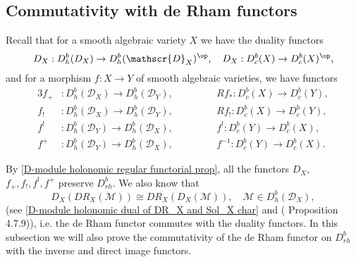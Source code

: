 \subsection{Commutativity with de Rham functors}
Recall that for a smooth algebraic variety $X$ we have the duality functors
\[D_X:D^b_h(D_X)\to D^b_h(\mathscr{D}_X)^{\op},\quad D_X:D^b_c(X)\to D^b_c(X)^{\op},\]
and for a morphism $f:X\to Y$ of smooth algebraic varieties, we have functors
\begin{alignat*}{3}
f_+&:D^b_h(\mathscr{D}_X)\to D^b_h(\mathscr{D}_Y),&\quad\quad&& Rf_*:D^b_c(X)\to D^b_c(Y),\\
f_!&:D^b_h(\mathscr{D}_X)\to D^b_h(\mathscr{D}_Y),&\quad\quad&& Rf_!:D^b_c(X)\to D^b_c(Y),\\
f^!&:D^b_h(\mathscr{D}_Y)\to D^b_h(\mathscr{D}_X),&\quad\quad&& f^!:D^b_c(Y)\to D^b_c(X),\\
f^+&:D^b_h(\mathscr{D}_Y)\to D^b_h(\mathscr{D}_X),&\quad\quad&& f^{-1}:D^b_c(Y)\to D^b_c(X).
\end{alignat*}

By \cref{D-module holonomic regular functorial prop}, all the functors $D_X$, $f_+,f_!,f^!,f^+$ preserve $D^b_{rh}$. We also know that
\begin{equation}\label{D-module holonomic regular de Rham functor commutativity-1}
D_X(DR_X(\mathscr{M}))\cong DR_X(D_X(\mathscr{M})),\quad \mathscr{M}\in D^b_h(\mathscr{D}_X),
\end{equation}
(see \cref{D-module holonomic dual of DR_X and Sol_X char} and (\cite{Hotta} Proposition 4.7.9)), i.e. the de Rham functor commutes with the duality functors. In this subsection we will also prove the commutativity of the de Rham functor on $D^b_{rh}$ with the inverse and direct image functors.\par

